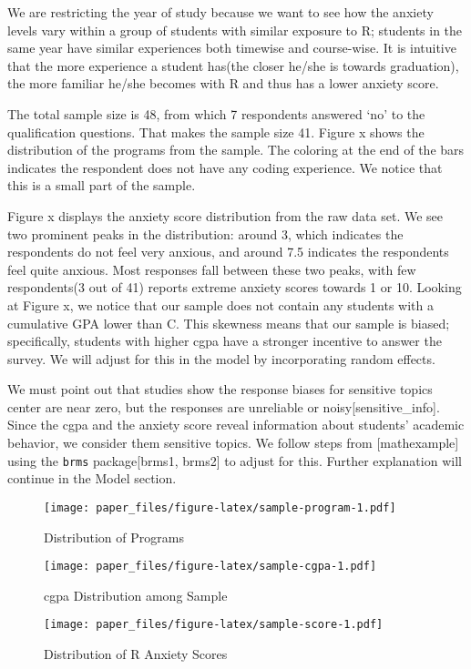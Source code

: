 \documentclass[
]{article}
\begin{document}
We are restricting the year of study because we want to see how the
anxiety levels vary within a group of students with similar exposure to
R; students in the same year have similar experiences both timewise and
course-wise. It is intuitive that the more experience a student has(the
closer he/she is towards graduation), the more familiar he/she becomes
with R and thus has a lower anxiety score.

The total sample size is 48, from which 7 respondents answered `no' to
the qualification questions. That makes the sample size 41. Figure x
shows the distribution of the programs from the sample. The coloring at
the end of the bars indicates the respondent does not have any coding
experience. We notice that this is a small part of the sample.

Figure x displays the anxiety score distribution from the raw data set.
We see two prominent peaks in the distribution: around 3, which
indicates the respondents do not feel very anxious, and around 7.5
indicates the respondents feel quite anxious. Most responses fall
between these two peaks, with few respondents(3 out of 41) reports
extreme anxiety scores towards 1 or 10. Looking at Figure x, we notice
that our sample does not contain any students with a cumulative GPA
lower than C. This skewness means that our sample is biased;
specifically, students with higher cgpa have a stronger incentive to
answer the survey. We will adjust for this in the model by incorporating
random effects.

We must point out that studies show the response biases for sensitive
topics center are near zero, but the responses are unreliable or
noisy{[}sensitive\_info{]}. Since the cgpa and the anxiety score reveal
information about students' academic behavior, we consider them
sensitive topics. We follow steps from {[}mathexample{]} using the
\texttt{brms} package{[}brms1, brms2{]} to adjust for this. Further
explanation will continue in the Model section.

\begin{figure}
\centering
\texttt{[image: paper\_files/figure-latex/sample-program-1.pdf]}
\caption{Distribution of Programs}
\end{figure}

\begin{figure}
\centering
\texttt{[image: paper\_files/figure-latex/sample-cgpa-1.pdf]}
\caption{cgpa Distribution among Sample}
\end{figure}

\begin{figure}
\centering
\texttt{[image: paper\_files/figure-latex/sample-score-1.pdf]}
\caption{Distribution of R Anxiety Scores}
\end{figure}
\end{document}
